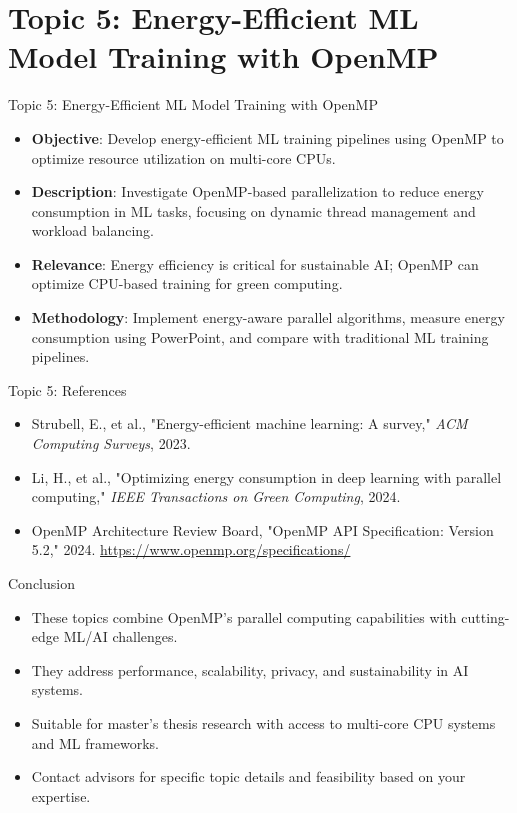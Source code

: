 \documentclass{beamer}
\begin{document}
\section{Topic 5: Energy-Efficient ML Model Training with OpenMP}
\begin{frame}{Topic 5: Energy-Efficient ML Model Training with OpenMP}
\begin{itemize}
    \item \textbf{Objective}: Develop energy-efficient ML training pipelines using OpenMP to optimize resource utilization on multi-core CPUs.
    \item \textbf{Description}: Investigate OpenMP-based parallelization to reduce energy consumption in ML tasks, focusing on dynamic thread management and workload balancing.
    \item \textbf{Relevance}: Energy efficiency is critical for sustainable AI; OpenMP can optimize CPU-based training for green computing.
    \item \textbf{Methodology}: Implement energy-aware parallel algorithms, measure energy consumption using 
PowerPoint, and compare with traditional ML training pipelines.
\end{itemize}
\end{frame}

\begin{frame}{Topic 5: References}
\begin{itemize}
    \item 
          Strubell, E., et al., "Energy-efficient machine learning: A survey," \textit{ACM Computing Surveys}, 2023.
    \item
          Li, H., et al., "Optimizing energy consumption in deep learning with parallel computing," \textit{IEEE Transactions on Green Computing}, 2024.
    \item
          OpenMP Architecture Review Board, "OpenMP API Specification: Version 5.2," 2024. \url{https://www.openmp.org/specifications/}
\end{itemize}
\end{frame}

\begin{frame}{Conclusion}
\begin{itemize}
    \item These topics combine OpenMP's parallel computing capabilities with cutting-edge ML/AI challenges.
    \item They address performance, scalability, privacy, and sustainability in AI systems.
    \item Suitable for master’s thesis research with access to multi-core CPU systems and ML frameworks.
    \item Contact advisors for specific topic details and feasibility based on your expertise.
\end{itemize}
\end{frame}
\end{document}
